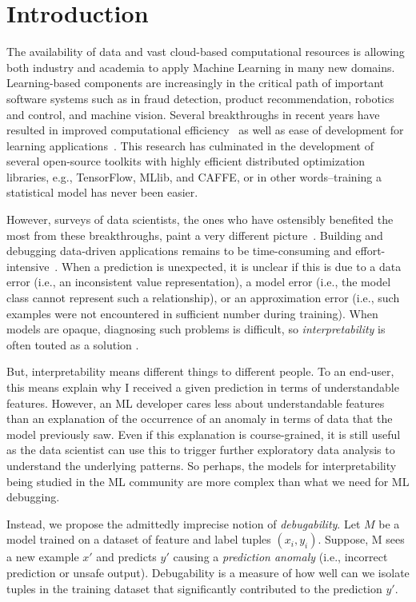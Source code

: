 \section{Introduction}\label{intro}
The availability of data and vast cloud-based computational resources is allowing both industry and academia to apply Machine Learning in many new domains.
Learning-based components are increasingly in the critical path of important software systems such as in fraud detection, product recommendation, robotics and control, and machine vision.
Several breakthroughs in recent years have resulted in improved computational efficiency~\cite{feng2012towards, tensor, recht2011hogwild, crotty2014tupleware} as well as ease of development for learning applications~\cite{hellerstein2012madlib, keystone, kraska2013mlbase}.
This research has culminated in the development of several open-source toolkits with highly efficient distributed optimization libraries, e.g., TensorFlow, MLlib, and CAFFE, or in other words--training a statistical model has never been easier.

However, surveys of data scientists, the ones who have ostensibly benefited the most from these breakthroughs, paint a very different picture~\cite{kandel2012, krishnan2016hilda}.
Building and debugging data-driven applications remains to be time-consuming and effort-intensive~\cite{sculley2014machine}.
When a prediction is unexpected, it is unclear if this is due to a data error (i.e., an inconsistent value representation), a model error (i.e., the model class cannot represent such a relationship), or an approximation error (i.e., such examples were not encountered in sufficient number during training).
When models are opaque, diagnosing such problems is difficult, so \emph{interpretability} is often touted as a solution \cite{?}.

But, interpretability means different things to different people. To an end-user, this means explain why I received a given prediction in terms of understandable features. However, an ML developer cares less about understandable features than an explanation of the occurrence of an anomaly in terms of data that the model previously saw. Even if this explanation is course-grained, it is still useful as the data scientist can use this to trigger further exploratory data analysis to understand the underlying patterns. So perhaps, the models for interpretability being studied in the ML community are more complex than what we need for ML debugging.

Instead, we propose the admittedly imprecise notion of \emph{debugability}.
Let $M$ be a model trained on a dataset of feature and label tuples $(x_i,y_i)$.
Suppose, M sees a new example $x'$ and predicts $y'$ causing a \emph{prediction anomaly} (i.e., incorrect prediction or unsafe output).
Debugability is a measure of how well can we isolate tuples in the training dataset that significantly contributed to the prediction $y'$.

